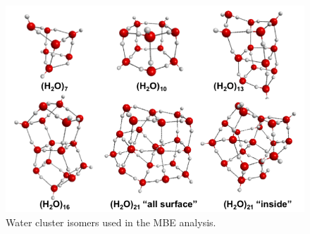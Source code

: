\begin{figure}[h]
\uwsinglespace
\centering
\includegraphics[width=\textwidth]{Figures/Chapter_2/cluster_structures.png}
\caption[Water cluster isomers used in the MBE analysis.]{Water cluster isomers used in the MBE analysis.}
\label{fig:MBE_I_F1}
\end{figure}